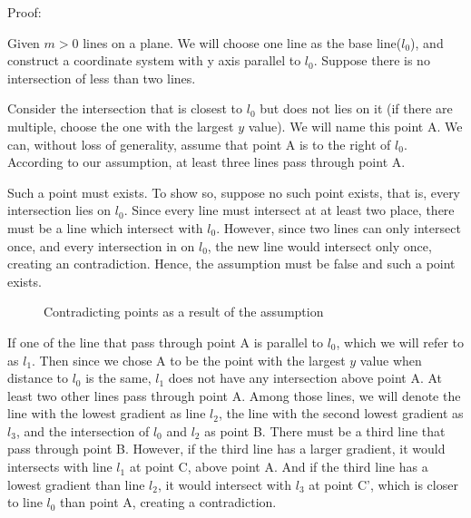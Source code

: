 \documentclass[a4paper, 12pt]{article}
\begin{document}
Proof:

Given $m>0$ lines on a plane. We will choose one line as the base line($l_0$), and construct a coordinate system with y axis parallel to $l_0$. Suppose there is no intersection of less than two lines. 

Consider the intersection that is closest to $l_0$ but does not lies on it (if there are multiple, choose the one with the largest $y$ value). We will name this point A. We can, without loss of generality, assume that point A is to the right of $l_0$. According to our assumption, at least three lines pass through point A.

Such a point must exists. To show so, suppose no such point exists, that is, every intersection lies on $l_0$. Since every line must intersect at at least two place, there must be a line which intersect with $l_0$. However, since two lines can only intersect once, and every intersection in on $l_0$, the new line would intersect only once, creating an contradiction. Hence, the assumption must be false and such a point exists.

\begin{wrapfigure}{r}{0.25\textwidth}
    
    \caption{Contradicting points as a result of the assumption}
    \label{fig:triple_intersect_para_1}
\end{wrapfigure}
If one of the line that pass through point A is parallel to $l_0$, which we will refer to as $l_1$. Then since we chose A to be the point with the largest $y$ value when distance to $l_0$ is the same, $l_1$ does not have any intersection above point A. At least two other lines pass through point A. Among those lines, we will denote the line with the lowest gradient as line $l_2$, the line with the second lowest gradient as $l_3$, and the intersection of $l_0$ and $l_2$ as point B. There must be a third line that pass through point B. However, if the third line has a larger gradient, it would intersects with line $l_1$ at point C, above point A. And if the third line has a lowest gradient than line $l_2$, it would intersect with $l_3$ at point C', which is closer to line $l_0$ than point A, creating a contradiction.

\end{document}
